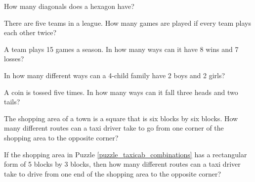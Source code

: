 \begin{puzzle}
    How many diagonals does a hexagon have?
\end{puzzle}

\begin{puzzle}
    There are five teams in a league. How many games are played if every team plays each other twice?
\end{puzzle}

\begin{puzzle}
    A team plays 15 games a season. In how many ways can it have 8 wins and 7 losses?
\end{puzzle}

\begin{puzzle}
    In how many different ways can a 4-child family have 2 boys and 2 girls?
\end{puzzle}

\begin{puzzle}
    A coin is tossed five times. In how many ways can it fall three heads and two tails?
\end{puzzle}

\begin{puzzle}\label{puzzle_taxicab_combinations}
    The shopping area of a town is a square that is six blocks by six blocks. How many different routes can a taxi driver take to go from one corner of the shopping area to the opposite corner?
\end{puzzle}

\begin{puzzle}
    If the shopping area in Puzzle \ref{puzzle_taxicab_combinations} has a rectangular form of 5 blocks by 3 blocks, then how many different routes can a taxi driver take to drive from one end of the shopping area to the opposite corner?
\end{puzzle}
